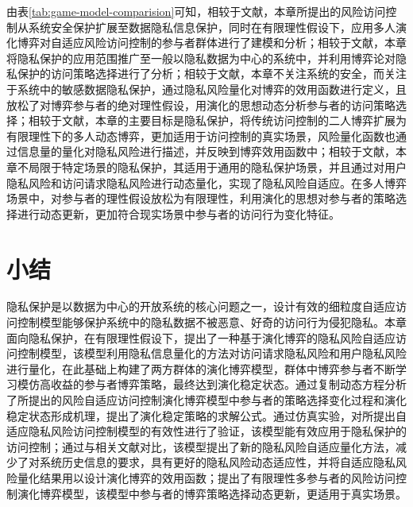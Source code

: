 由表\ref{tab:game-model-comparision}可知，相较于文献\cite{ni2010risk,shaikh2012dynamic,santos2016framework}，本章所提出的风险访问控制从系统安全保护扩展至数据隐私信息保护，同时在有限理性假设下，应用多人演化博弈对自适应风险访问控制的参与者群体进行了建模和分析；相较于文献\cite{wang2011quantified,zhang2018privacy}，本章将隐私保护的应用范围推广至一般以隐私数据为中心的系统中，并利用博弈论对隐私保护的访问策略选择进行了分析；相较于文献\cite{gao2018game,liu2016dynamic}，本章不关注系统的安全，而关注于系统中的敏感数据隐私保护，通过隐私风险量化对博弈的效用函数进行定义，且放松了对博弈参与者的绝对理性假设，用演化的思想动态分析参与者的访问策略选择；相较于文献\cite{helil2017non}，本章的主要目标是隐私保护，将传统访问控制的二人博弈扩展为有限理性下的多人动态博弈，更加适用于访问控制的真实场景，风险量化函数也通过信息量的量化对隐私风险进行描述，并反映到博弈效用函数中；相较于文献\cite{hu2014game}，本章不局限于特定场景的隐私保护，其适用于通用的隐私保护场景，并且通过对用户隐私风险和访问请求隐私风险进行动态量化，实现了隐私风险自适应。在多人博弈场景中，对参与者的理性假设放松为有限理性，利用演化的思想对参与者的策略选择进行动态更新，更加符合现实场景中参与者的访问行为变化特征。
 \section{小结}
隐私保护是以数据为中心的开放系统的核心问题之一，设计有效的细粒度自适应访问控制模型能够保护系统中的隐私数据不被恶意、好奇的访问行为侵犯隐私。本章面向隐私保护，在有限理性假设下，提出了一种基于演化博弈的隐私风险自适应访问控制模型，该模型利用隐私信息量化的方法对访问请求隐私风险和用户隐私风险进行量化，在此基础上构建了两方群体的演化博弈模型，群体中博弈参与者不断学习模仿高收益的参与者博弈策略，最终达到演化稳定状态。通过复制动态方程分析了所提出的风险自适应访问控制演化博弈模型中参与者的策略选择变化过程和演化稳定状态形成机理，提出了演化稳定策略的求解公式。通过仿真实验，对所提出自适应隐私风险访问控制模型的有效性进行了验证，该模型能有效应用于隐私保护的访问控制；通过与相关文献对比，该模型提出了新的隐私风险自适应量化方法，减少了对系统历史信息的要求，具有更好的隐私风险动态适应性，并将自适应隐私风险量化结果用以设计演化博弈的效用函数；提出了有限理性多参与者的风险访问控制演化博弈模型，该模型中参与者的博弈策略选择动态更新，更适用于真实场景。